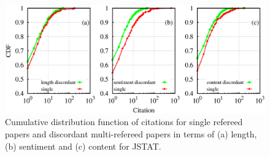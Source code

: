 \begin{figure}
 \centering
 \includegraphics[scale = 0.3]{./texfiles/Chapter_4/cikm_17/figures/citation_mul_all_dis.eps}
 \caption{\label{con:citation_dis} Cumulative distribution function of citations for single refereed papers and discordant multi-refereed papers in terms of (a) length, (b) sentiment 
 and (c) content for JSTAT.} 
\end{figure}

\medskip
